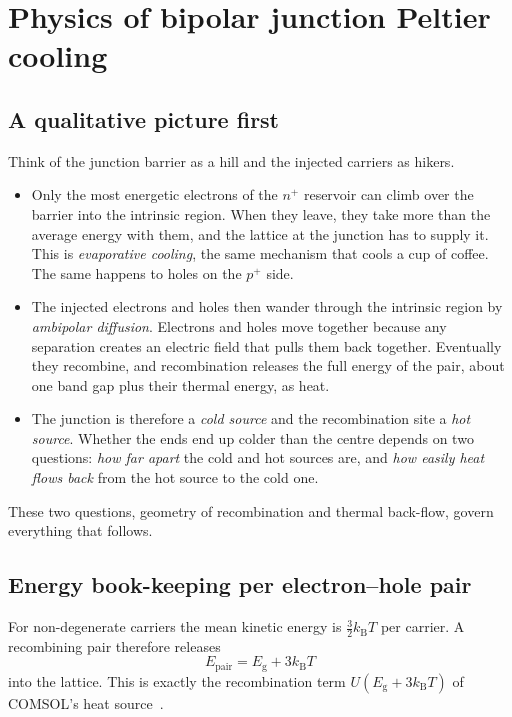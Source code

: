 \documentclass[11pt,a4paper]{article}
\newcommand{\kB}{k_{\mathrm{B}}}
\newcommand{\Eg}{E_{\mathrm{g}}}
\newcommand{\Ep}{E_{\mathrm{pair}}}
\begin{document}
\section{Physics of bipolar junction Peltier cooling}\label{sec:physics}

\subsection{A qualitative picture first}
Think of the junction barrier as a hill and the injected carriers as hikers.
\begin{itemize}
  \item Only the most energetic electrons of the $n^+$ reservoir can climb over the barrier into the intrinsic region. When they leave, they take more than the average energy with them, and the lattice at the junction has to supply it. This is \emph{evaporative cooling}, the same mechanism that cools a cup of coffee. The same happens to holes on the $p^+$ side.
  \item The injected electrons and holes then wander through the intrinsic region by \emph{ambipolar diffusion}. Electrons and holes move together because any separation creates an electric field that pulls them back together. Eventually they recombine, and recombination releases the full energy of the pair, about one band gap plus their thermal energy, as heat.
  \item The junction is therefore a \emph{cold source} and the recombination site a \emph{hot source}. Whether the ends end up colder than the centre depends on two questions: \emph{how far apart} the cold and hot sources are, and \emph{how easily heat flows back} from the hot source to the cold one.
\end{itemize}
These two questions, geometry of recombination and thermal back-flow, govern everything that follows.

\subsection{Energy book-keeping per electron--hole pair}
For non-degenerate carriers the mean kinetic energy is $\tfrac32\kB T$ per carrier. A recombining pair therefore releases
\begin{equation}
  \Ep = \Eg + 3\kB T \label{eq:Epair}
\end{equation}
into the lattice. This is exactly the recombination term $U(\Eg+3\kB T)$ of COMSOL's heat source~\cite{comsol,wachutka}.
\end{document}
